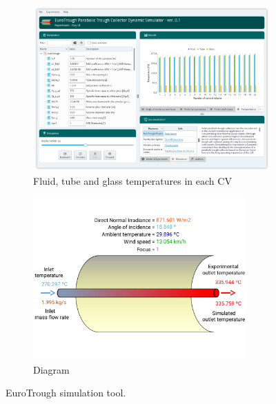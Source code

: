 \documentclass[final,3p,times,review]{elsarticle}
\begin{document}
\begin{figure}[h]
\begin{subfigure}[t]{0.48\textwidth}
		\includegraphics[width=\textwidth]{Figures/EuroTrough-surf3.png}
		\caption{Fluid, tube and glass temperatures in each CV}
		\label{fig:SimTool3}	
	\end{subfigure}
	\begin{subfigure}[t]{0.48\textwidth}
		\centering
		\includegraphics[width=0.9\textwidth]{Figures/EuroTrough-surf4.pdf}
		\caption{Diagram}
		\label{fig:SimTool4}
	\end{subfigure}	
	\caption{EuroTrough simulation tool.}
	\label{fig:SimTool}
\end{figure}
\end{document}

